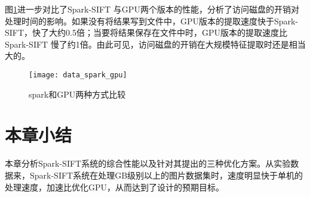 图\ref{fig:data_spark_gpu}进一步对比了Spark-SIFT 与GPU两个版本的性能，分析了访问磁盘的开销对处理时间的影响。如果没有将结果写到文件中，GPU版本的提取速度快于Spark-SIFT，快了大约0.5倍；当要将结果保存在文件中时，GPU版本的提取速度比Spark-SIFT 慢了约1倍。由此可见，访问磁盘的开销在大规模特征提取时还是相当大的。
\begin{figure}[htp]
\centering
\texttt{[image: data\_spark\_gpu]}
\caption{spark和GPU两种方式比较}
\label{fig:data_spark_gpu}
\end{figure}
\section{本章小结}
本章分析Spark-SIFT系统的综合性能以及针对其提出的三种优化方案。从实验数据来，Spark-SIFT系统在处理GB级别以上的图片数据集时，速度明显快于单机的处理速度，加速比优化GPU，从而达到了设计的预期目标。

